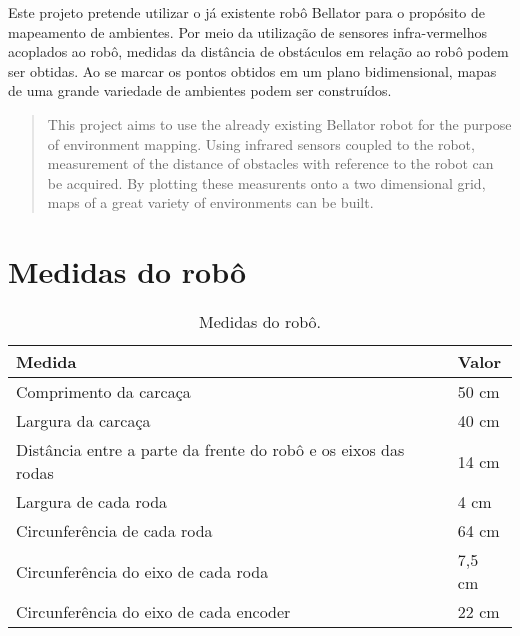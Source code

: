 \documentclass[oneside,a4paper,12pt]{normas-utf-tex}
\renewcommand{\toprule}{\midrule[\heavyrulewidth]}
\begin{document}
\capa
\folhaderosto

\begin{resumo}

Este projeto pretende utilizar o já existente robô Bellator para o propósito de mapeamento de ambientes. Por meio da utilização de sensores infra-vermelhos acoplados ao robô, medidas da distância de obstáculos em relação ao robô podem ser obtidas. Ao se marcar os pontos obtidos em um plano bidimensional, mapas de uma grande variedade de ambientes podem ser construídos.

\end{resumo}

\begin{abstract}

This project aims to use the already existing Bellator robot for the purpose of environment mapping. Using infrared sensors coupled to the robot, measurement of the distance of obstacles with reference to the robot can be acquired. By plotting these measurents onto a two dimensional grid, maps of a great variety of environments can be built.

\end{abstract}
\listadefiguras
\listadetabelas
\sumario













\apendice

\chapter{Medidas do robô}
\label{cap:medidas_robo}


\begin{table}[h]
  \caption{Medidas do robô.}
  \centering
  \begin{tabular}{l|l}
    \toprule
    \textbf{Medida} & \textbf{Valor} \\
    \midrule
    Comprimento da carcaça & 50 cm \\ \hline
    Largura da carcaça & 40 cm \\ \hline
    Distância entre a parte da frente do robô e os eixos das rodas & 14 cm \\ \hline
    Largura de cada roda & 4 cm \\ \hline
    Circunferência de cada roda & 64 cm \\ \hline
    Circunferência do eixo de cada roda & 7,5 cm \\ \hline
    Circunferência do eixo de cada encoder & 22 cm \\ 
    \bottomrule
  \end{tabular}
  \label{tab:medidas_robo}
\end{table}


\raggedright

\end{document}

